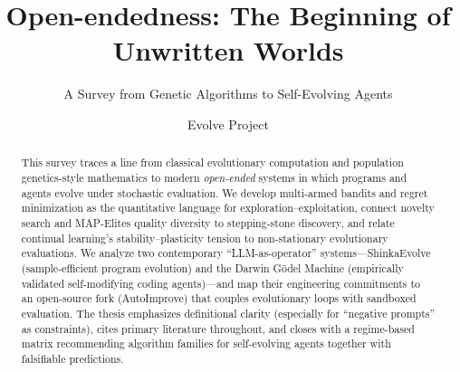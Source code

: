 \documentclass[acmsurvey,manuscript,screen,nonacm]{acmart}
\title[Open-endedness]{Open-endedness: The Beginning of Unwritten Worlds}
\subtitle{A Survey from Genetic Algorithms to Self-Evolving Agents}
\author{Evolve Project}
\affiliation{%
  \institution{Your Institution}
  \department{Your Department}
  \city{Your City}
  \country{Your Country}}
\begin{document}
\begin{abstract}
This survey traces a line from classical evolutionary computation and population genetics-style mathematics to modern \emph{open-ended} systems in which programs and agents evolve under stochastic evaluation.
We develop multi-armed bandits and regret minimization as the quantitative language for exploration--exploitation, connect novelty search and MAP-Elites quality diversity to stepping-stone discovery, and relate continual learning's stability--plasticity tension to non-stationary evolutionary evaluations.
We analyze two contemporary ``LLM-as-operator'' systems---ShinkaEvolve (sample-efficient program evolution) and the Darwin G\"odel Machine (empirically validated self-modifying coding agents)---and map their engineering commitments to an open-source fork (AutoImprove) that couples evolutionary loops with sandboxed evaluation.
The thesis emphasizes definitional clarity (especially for ``negative prompts'' as constraints), cites primary literature throughout, and closes with a regime-based matrix recommending algorithm families for self-evolving agents together with falsifiable predictions.
\end{abstract}

\maketitle


















\end{document}
